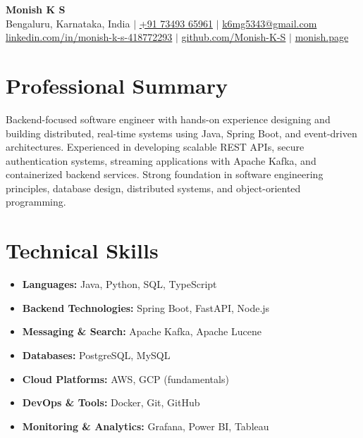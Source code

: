\documentclass[10pt, letterpaper]{article}
\begin{document}
\begin{center}
  {\LARGE \textbf{Monish K S}} \\[4pt]
  Bengaluru, Karnataka, India \quad $\vert$ \quad
  \href{tel:7349365961}{+91 73493 65961} \quad $\vert$ \quad
  \href{mailto:k6mg5343@gmail.com}{k6mg5343@gmail.com} \\[3pt]
  \href{https://www.linkedin.com/in/monish-k-s-418772293/}{linkedin.com/in/monish-k-s-418772293} \quad $\vert$ \quad
  \href{https://github.com/Monish-K-S}{github.com/Monish-K-S} \quad $\vert$ \quad
  \href{https://monish.page}{monish.page}
\end{center}

\section{Professional Summary}

Backend-focused software engineer with hands-on experience designing and building distributed, real-time systems using Java, Spring Boot, and event-driven architectures. Experienced in developing scalable REST APIs, secure authentication systems, streaming applications with Apache Kafka, and containerized backend services. Strong foundation in software engineering principles, database design, distributed systems, and object-oriented programming.

\section{Technical Skills}

\begin{itemize}[leftmargin=0.18in, itemsep=5pt, topsep=4pt]
\item \textbf{Languages:} Java, Python, SQL, TypeScript
\item \textbf{Backend Technologies:} Spring Boot, FastAPI, Node.js
\item \textbf{Messaging \& Search:} Apache Kafka, Apache Lucene
\item \textbf{Databases:} PostgreSQL, MySQL
\item \textbf{Cloud Platforms:} AWS, GCP (fundamentals)
\item \textbf{DevOps \& Tools:} Docker, Git, GitHub
\item \textbf{Monitoring \& Analytics:} Grafana, Power BI, Tableau
\end{itemize}
\end{document}
